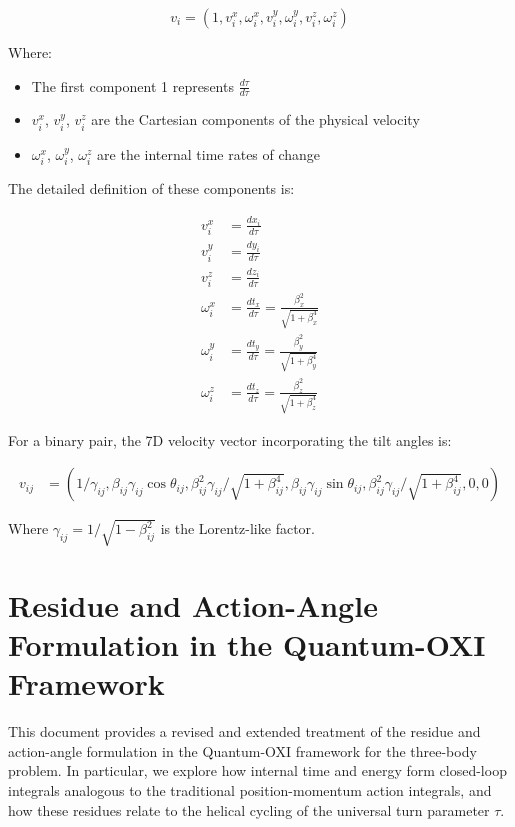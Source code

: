 \documentclass{article}
\begin{document}
\begin{equation}
v_i = (1, v_i^x, \omega_i^x, v_i^y, \omega_i^y, v_i^z, \omega_i^z)
\end{equation}

Where:
\begin{itemize}
\item The first component 1 represents $\frac{d\tau}{d\tau}$
\item $v_i^x$, $v_i^y$, $v_i^z$ are the Cartesian components of the physical velocity
\item $\omega_i^x$, $\omega_i^y$, $\omega_i^z$ are the internal time rates of change
\end{itemize}

The detailed definition of these components is:

\begin{align}
v_i^x &= \frac{dx_i}{d\tau} \\
v_i^y &= \frac{dy_i}{d\tau} \\
v_i^z &= \frac{dz_i}{d\tau} \\
\omega_i^x &= \frac{dt_x}{d\tau} = \frac{\beta_x^2}{\sqrt{1+\beta_x^4}} \\
\omega_i^y &= \frac{dt_y}{d\tau} = \frac{\beta_y^2}{\sqrt{1+\beta_y^4}} \\
\omega_i^z &= \frac{dt_z}{d\tau} = \frac{\beta_z^2}{\sqrt{1+\beta_z^4}}
\end{align}

For a binary pair, the 7D velocity vector incorporating the tilt angles is:

\begin{align}
v_{ij} &= (1/\gamma_{ij}, \beta_{ij}\gamma_{ij}\cos\theta_{ij}, \beta_{ij}^2\gamma_{ij}/\sqrt{1+\beta_{ij}^4}, \beta_{ij}\gamma_{ij}\sin\theta_{ij}, \beta_{ij}^2\gamma_{ij}/\sqrt{1+\beta_{ij}^4}, 0, 0)
\end{align}

Where $\gamma_{ij} = 1/\sqrt{1-\beta_{ij}^2}$ is the Lorentz-like factor.






\section{Residue and Action-Angle Formulation in the Quantum-OXI Framework}

This document provides a revised and extended treatment of the residue and action-angle formulation in the Quantum-OXI framework for the three-body problem. In particular, we explore how internal time and energy form closed-loop integrals analogous to the traditional position-momentum action integrals, and how these residues relate to the helical cycling of the universal turn parameter $\tau$.
\end{document}
